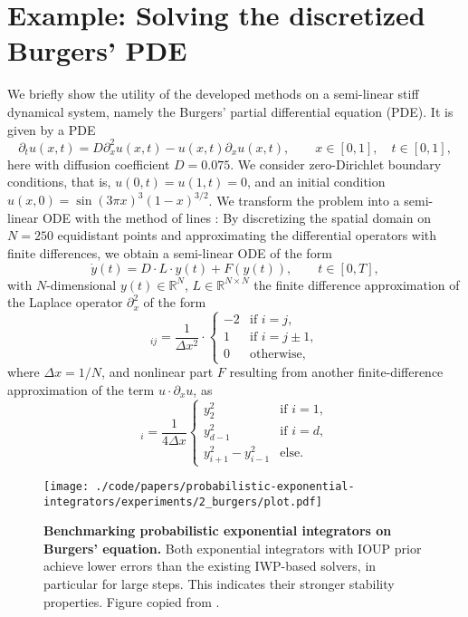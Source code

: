 \documentclass{mimosis}
\begin{document}
\section{Example: Solving the discretized Burgers' PDE}
\label{sec:orgb476012}
We briefly show the utility of the developed methods on a semi-linear stiff dynamical system, namely the Burgers' partial differential equation (PDE).
It is given by a PDE
\begin{equation}
  \label{eq:burgers-pde}
  \partial_t u(x, t) = D \partial_x^2 u(x, t) - u(x, t) \partial_x u(x, t), \qquad x \in [0, 1], \quad t \in [0, 1],
\end{equation}
here with diffusion coefficient \(D=0.075\).
We consider zero-Dirichlet boundary conditions, that is, \(u(0, t) = u(1, t) = 0\),
and an initial condition \(u(x, 0) = \sin(3\pi x)^3 (1 - x)^{3/2}\).
We transform the problem into a semi-linear ODE with the method of lines
\parencite{Madsen1975,Schiesser2012}:
By discretizing the spatial domain on \(N=250\) equidistant points and approximating the differential operators with finite differences, we obtain a semi-linear ODE of the form
\begin{equation}
  \label{eq:burgers-ode}
  \dot{y}(t) = D \cdot L \cdot y(t) + F(y(t)), \qquad t \in [0, T],
\end{equation}
with \(N\)-dimensional \(y(t) \in \mathbb{R}^N\),
\(L \in \mathbb{R}^{N \times N}\) the finite difference approximation of the Laplace operator \(\partial_x^2\) of the form
\begin{equation}
  [L]_{ij} = \frac{1}{\Delta x^2} \cdot \begin{cases}
    -2 & \text{if } i = j, \\
    1 & \text{if } i = j \pm 1, \\
    0 & \text{otherwise},
  \end{cases}
\end{equation}
where \(\Delta x = 1/N\),
and nonlinear part \(F\) resulting from another finite-difference approximation of the term \(u \cdot \partial_x u\), as
\begin{equation}
  [F(y)]_i = \frac{1}{4 \Delta x} \begin{cases}
  y_{2}^2& \text{if } i=1, \\
  y_{d-1}^2& \text{if } i=d, \\
  y_{i+1}^2 - y_{i-1}^2 & \text{else.}
  \end{cases}
\end{equation}

\begin{figure}[t]
\centering
\texttt{[image: ./code/papers/probabilistic-exponential-integrators/experiments/2\_burgers/plot.pdf]}
\caption{\label{fig:probexpint:experiment}\textbf{Benchmarking probabilistic exponential integrators on Burgers' equation.} Both exponential integrators with IOUP prior achieve lower errors than the existing IWP-based solvers, in particular for large steps. This indicates their stronger stability properties. Figure copied from \protect\probexpint{}.}
\end{figure}
\end{document}
